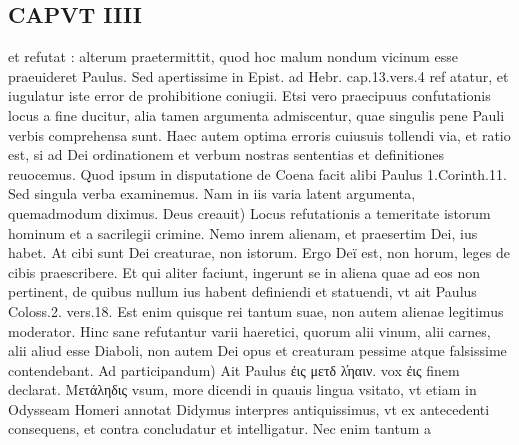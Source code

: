 \documentclass{article}
\begin{document}
\begin{pages}
\section*{CAPVT IIII }
\marginpar{[ p.187 ]}\pstart et refutat : alterum praetermittit, quod hoc malum nondum vicinum esse praeuideret Paulus. Sed apertissime in Epist. ad Hebr. cap.13.vers.4 ref atatur, et iugulatur iste error de prohibitione coniugii. Etsi vero praecipuus confutationis locus a fine ducitur, alia tamen argumenta admiscentur, quae singulis pene Pauli verbis comprehensa sunt. Haec autem optima erroris cuiusuis tollendi via, et ratio est, si ad Dei ordinationem et verbum nostras sententias et definitiones reuocemus. Quod ipsum in disputatione de Coena facit alibi Paulus 1.Corinth.11. Sed singula verba examinemus. Nam in iis varia latent argumenta, quemadmodum diximus. Deus creauit) Locus refutationis a temeritate istorum hominum et a sacrilegii crimine. Nemo inrem alienam, et praesertim Dei, ius habet. At cibi sunt Dei creaturae, non istorum. Ergo Deï est, non horum, leges de cibis praescribere. Et qui aliter faciunt, ingerunt se in aliena quae ad eos non pertinent, de quibus nullum ius habent definiendi et statuendi, vt ait Paulus Coloss.2. vers.18. Est enim quisque rei tantum suae, non autem alienae legitimus moderator. Hinc sane refutantur varii haeretici, quorum alii vinum, alii carnes, alii aliud esse Diaboli, non autem Dei opus et creaturam pessime atque falsissime contendebant. Ad participandum) Ait Paulus ἐις μετδ λ̓ηαιν. vox ἐις finem declarat. Μετάληδις vsum, more dicendi in quauis lingua vsitato, vt etiam in Odysseam Homeri annotat Didymus interpres antiquissimus, vt ex antecedenti consequens, et contra concludatur et intelligatur. Nec enim tantum a  \pend

\end{pages}
\end{document}
